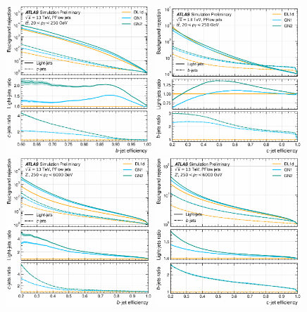 \begin{figure}[ht]
    \centering
    \includegraphics[width=0.49\textwidth]{figures/flavour_tagging/fig_06a.pdf}
    \includegraphics[width=0.49\textwidth]{figures/flavour_tagging/fig_07a.pdf}
    \includegraphics[width=0.49\textwidth]{figures/flavour_tagging/fig_06b.pdf}
    \includegraphics[width=0.49\textwidth]{figures/flavour_tagging/fig_07b.pdf}

\end{figure}
